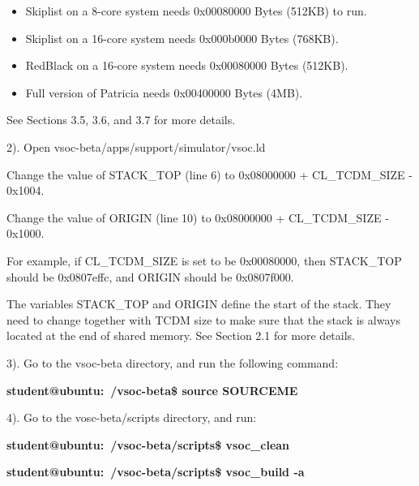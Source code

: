 \documentclass{article}
\begin{document}
{
\addtolength{\leftskip}{6mm}

\vspace{-2mm}

\begin{itemize}
\item Skiplist on a 8-core system needs 0x00080000 Bytes (512KB) to run.
\item Skiplist on a 16-core system needs 0x000b0000 Bytes (768KB).
\item RedBlack on a 16-core system needs 0x00080000 Bytes (512KB).
\item Full version of Patricia needs 0x00400000 Bytes (4MB).
\end{itemize}

\vspace{-2mm}
See Sections 3.5, 3.6, and 3.7 for more details.

}

\vspace{2mm}
2). Open vsoc-beta/apps/support/simulator/vsoc.ld 

{
\addtolength{\leftskip}{6mm}

Change the value of STACK\_TOP (line 6) to 0x08000000 + CL\_TCDM\_SIZE - 0x1004.

Change the value of ORIGIN (line 10) to 0x08000000 + CL\_TCDM\_SIZE - 0x1000.

For example, if CL\_TCDM\_SIZE is set to be 0x00080000, then STACK\_TOP should be 0x0807effc, and ORIGIN should be 0x0807f000.

The variables STACK\_TOP and ORIGIN define the start of the stack. They need to change together with TCDM size to make sure that the stack is always located at the end of shared memory. See Section 2.1 for more details.

}

\vspace{2mm}
3). Go to the vsoc-beta directory, and run the following command:

{
\addtolength{\leftskip}{6mm}

{\bf student@ubuntu:~/vsoc-beta\$ source SOURCEME}

}

\vspace{2mm}
4). Go to the vosc-beta/scripts directory, and run:

{
\addtolength{\leftskip}{6mm}

{\bf student@ubuntu:~/vsoc-beta/scripts\$ vsoc\_clean}

{\bf student@ubuntu:~/vsoc-beta/scripts\$ vsoc\_build -a}

}
\end{document}
